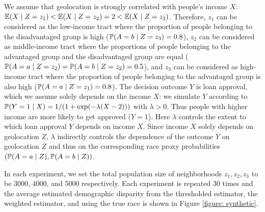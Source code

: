 We assume that geolocation is strongly correlated with people's income $X$: $\mathbb{E} (X \mid Z = z_1) < \mathbb{E} (X \mid Z = z_2) = 2 < \mathbb{E} (X \mid Z = z_3)$. Therefore, $z_1$ can be considered as the low-income tract where  the proportion of people belonging to the disadvantaged group is high ($\mathbb{P} (A = b \mid Z = z_3) = 0.8$), $z_2$ can be considered as middle-income tract where the proportions of people belonging to the advantaged group and the disadvantaged group are equal ($\mathbb{P} (A = a \mid Z = z_2) = \mathbb{P} (A = b \mid Z = z_2) = 0.5$), and $z_3$ can be considered as high-income tract where the proportion of people belonging to the advantaged group is also high ($\mathbb{P} (A = a \mid Z = z_1) = 0.8$). The decision outcome $Y$ is loan approval, which we assume solely depends on the income $X$: we simulate $Y$ according to $\mathbb{P} (Y = 1 \mid X) = 1/(1 + \exp(-\lambda(X - 2)))$ with $\lambda > 0$. Thus  people with higher income are more likely to get approved ($Y = 1$). Here $\lambda$ controls the extent to which loan approval $Y$ depends on income $X$. Since income $X$ solely depends on geolocation $Z$, $\lambda$ indirectly controls the dependence of the outcome $Y$ on geolocation $Z$ and thus on the corresponding race proxy probabilities $(\mathbb{P} (A = a \mid Z), \mathbb{P} (A = b \mid Z))$.

In each experiment, we set the total population size of neighborhoods $z_1, z_2, z_3$ to be 3000, 4000, and 5000 respectively. Each experiment is repeated $30$ times and the average estimated demographic disparity from the thresholded estimator, the weighted estimator, and using the true race is shown in Figure \ref{figure: synthetic}.

